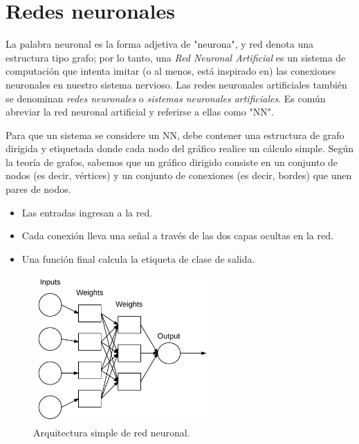\documentclass[a4paper,12pt]{article}
\begin{document}
\section{Redes neuronales}
La palabra neuronal es la forma adjetiva de "neurona", y red denota una estructura tipo grafo; por lo tanto, una \textit{Red Neuronal Artificial} es un sistema de computación que intenta imitar (o al menos, está inspirado en) las conexiones neuronales en nuestro sistema nervioso. Las redes neuronales artificiales también se denominan \textit{redes neuronales} o \textit{sistemas neuronales artificiales}. Es común abreviar la red neuronal artificial y referirse a ellas como "NN". \citep{rosebrock2017deep}

Para que un sistema se considere un NN, debe contener una estructura de grafo dirigida y etiquetada donde cada nodo del gráfico realice un cálculo simple. Según la teoría de grafos, sabemos que un gráfico dirigido consiste en un conjunto de nodos (es decir, vértices) y un conjunto de conexiones (es decir, bordes) que unen pares de nodos.

\begin{itemize}
\item Las entradas ingresan a la red. 
\item Cada conexión lleva una señal a través de las dos capas ocultas en la red. 
\item Una función final calcula la etiqueta de clase de salida.
\end{itemize}

\begin{figure}[H]
	\begin{center}				
	\includegraphics[width=0.6\textwidth]{018.png}
  	\caption{Arquitectura simple de red neuronal. \cite{matich}}
  	\label{fig:nn}
  	\end{center}
\end{figure}
\end{document}
